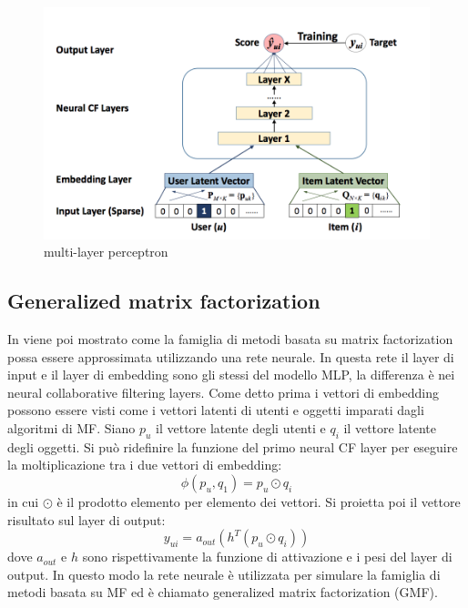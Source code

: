 \documentclass[12pt,italian]{report}
\begin{document}
\begin{figure}
  \includegraphics[width=\linewidth]{immagini/ncf.png}
  \caption{multi-layer perceptron}
  \label{fig:ncf}
\end{figure}

\subsection{Generalized matrix factorization}
In \cite{NCF} viene poi mostrato come la famiglia di metodi basata su matrix factorization possa essere approssimata utilizzando una rete neurale. In questa rete il layer di input e il layer di embedding sono gli stessi del modello MLP, la differenza è nei neural collaborative filtering layers. Come detto prima i vettori di embedding possono essere visti come i vettori latenti di utenti e oggetti imparati dagli algoritmi di MF. Siano $p_u$ il vettore latente degli utenti e $q_i$ il vettore latente degli oggetti. Si può ridefinire la funzione del primo neural CF layer per eseguire la moltiplicazione tra i due vettori di embedding:
$$
\phi(p_u, q_1) = p_u \odot q_i
$$
in cui $\odot$ è il prodotto elemento per elemento dei vettori. Si proietta poi il vettore risultato sul layer di output:
$$
y_{ui} = a_{out}(h^T(p_u \odot q_i))
$$
dove $a_{out}$ e $h$ sono rispettivamente la funzione di attivazione e  i pesi del layer di output. In questo modo la rete neurale è utilizzata per simulare la famiglia di metodi basata su MF ed è chiamato generalized matrix factorization (GMF).
\end{document}
